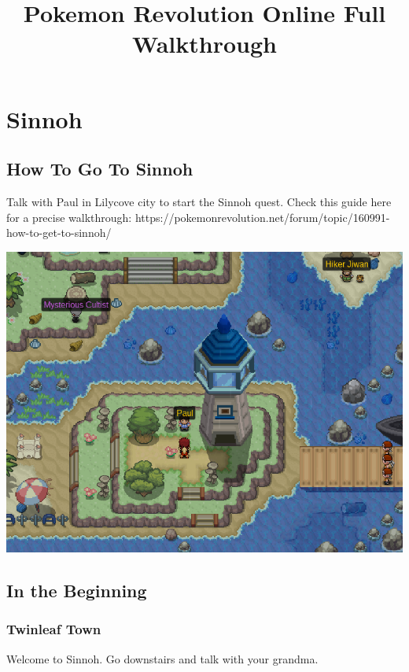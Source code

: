 \documentclass[11pt]{article}
\title{Pokemon Revolution Online Full Walkthrough}
\begin{document}
\pagecolor{LightColor}

\maketitle

\tableofcontents

\section{Sinnoh}\label{sec:sinnoh}

\subsection{How To Go To Sinnoh}\label{subsec:how-to-go-to-sinnoh}
Talk with Paul in Lilycove city to start the Sinnoh quest.
Check this guide here for a precise walkthrough:
https://pokemonrevolution.net/forum/topic/160991-how-to-get-to-sinnoh/

\includegraphics[width=\textwidth]{walkthrough/Sinnoh/paul-lilycove}

\subsection{In the Beginning}\label{subsec:in-the-beginning}

\subsubsection{Twinleaf Town}\label{subsubsec:twinleaf-town}
Welcome to Sinnoh.
Go downstairs and talk with your grandma.
\end{document}
